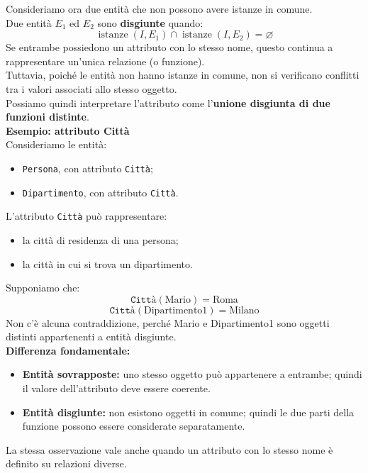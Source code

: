 Consideriamo ora due entità che non possono avere
istanze in comune.\\
Due entità $E_1$ ed $E_2$ sono \textbf{disgiunte} quando:
\[
\operatorname{istanze}(I,E_1)
\cap
\operatorname{istanze}(I,E_2)
=
\varnothing
\]
Se entrambe possiedono un attributo con lo stesso nome,
questo continua a rappresentare un'unica relazione
(o funzione).\\
Tuttavia, poiché le entità non hanno istanze in comune,
non si verificano conflitti tra i valori associati
allo stesso oggetto.\\
Possiamo quindi interpretare l'attributo come
l'\textbf{unione disgiunta di due funzioni distinte}.\\
\textcolor{verdeEsempio}{\textbf{Esempio: attributo Città}}\\
Consideriamo le entità:
\begin{itemize}
    \item \texttt{Persona}, con attributo \texttt{Città};
    \item \texttt{Dipartimento}, con attributo \texttt{Città}.
\end{itemize}
\noindent
L'attributo \texttt{Città} può rappresentare:
\begin{itemize}
    \item la città di residenza di una persona;
    \item la città in cui si trova un dipartimento.
\end{itemize}
Supponiamo che:
\[
\texttt{Città}(\text{Mario})=\text{Roma}
\]
\[
\texttt{Città}(\text{Dipartimento1})=\text{Milano}
\]
Non c'è alcuna contraddizione, perché Mario
e Dipartimento1 sono oggetti distinti
appartenenti a entità disgiunte.\\
\textbf{Differenza fondamentale:}
\begin{itemize}
    \item \textbf{Entità sovrapposte:}
    uno stesso oggetto può appartenere a entrambe;
    quindi il valore dell'attributo deve essere coerente.

    \item \textbf{Entità disgiunte:}
    non esistono oggetti in comune;
    quindi le due parti della funzione possono
    essere considerate separatamente.
\end{itemize}
\noindent
La stessa osservazione vale anche quando
un attributo con lo stesso nome è definito
su relazioni diverse.
